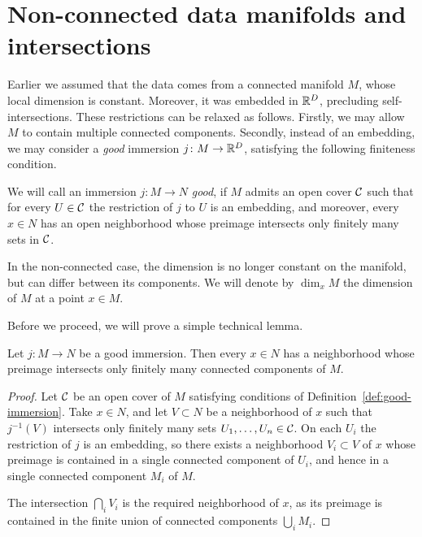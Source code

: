 \onecolumn
{}
\appendix








\section{Non-connected data manifolds and intersections}
\label{sec:non-connected}

Earlier we assumed that the data comes from a connected manifold $M$, whose local dimension is constant. Moreover, it was embedded in $\mathbb{R}^D$, precluding self-intersections. These restrictions can be relaxed as follows. Firstly, we may allow $M$ to contain multiple connected components. Secondly, instead of an embedding, we may consider a \emph{good} immersion $j\colon M\to \mathbb{R}^D$, satisfying the following finiteness condition.

\begin{definition}
\label{def:good-immersion}
    We will call an immersion $j\colon M\to N$ \emph{good}, if $M$ admits an open cover $\mathcal{C}$ such that for every $U\in\mathcal{C}$ the restriction of $j$ to $U$ is an embedding, and moreover, every $x\in N$ has an open neighborhood whose preimage intersects only finitely many sets in $\mathcal{C}$.
\end{definition}

In the non-connected case, the dimension is no longer constant on the manifold, but can differ between its components. We will denote by $\dim_x M$ the dimension of $M$ at a point $x\in M$.

Before we proceed, we will prove a simple technical lemma.

\begin{lemma}
\label{lem:finite-component-intersection}
    Let $j\colon M\to N$ be a good immersion. Then every $x\in N$ has a neighborhood whose preimage intersects only finitely many connected components of $M$.
\end{lemma}

\begin{proof}
    Let $\mathcal{C}$ be an open cover of $M$ satisfying conditions of Definition~\ref{def:good-immersion}. Take $x\in N$, and let $V \subset N$ be a neighborhood of $x$ such that $j^{-1}(V)$ intersects only finitely many sets $U_1,\dots, U_n\in\mathcal{C}$. On each $U_i$ the restriction of $j$ is an embedding, so there exists a neighborhood $V_i\subset V$ of $x$ whose preimage is contained in a single connected component of $U_i$, and hence in a single connected component $M_i$ of $M$. 
    
    The intersection $\bigcap_i V_i$ is the required neighborhood of $x$, as its preimage is contained in the finite union of connected components $\bigcup_i M_i$.
\end{proof}

